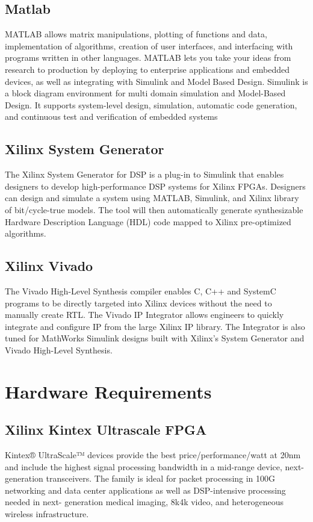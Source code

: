 \documentclass[10pt]{report}
\begin{document}
\subsection{Matlab}
MATLAB allows matrix manipulations, plotting of functions and data, implementation 
of algorithms, creation of user interfaces, and interfacing with programs written in other 
languages. MATLAB lets you take your ideas from research to production by deploying to 
enterprise applications and embedded devices, as well as integrating with Simulink and ModelBased Design. Simulink is a block diagram environment for multi domain simulation and 
Model-Based Design. It supports system-level design, simulation, automatic code generation, 
and continuous test and verification of embedded systems
\subsection{Xilinx System Generator}
The Xilinx System Generator for DSP is a plug-in to Simulink that enables designers 
to develop high-performance DSP systems for Xilinx FPGAs. Designers can design and 
simulate a system using MATLAB, Simulink, and Xilinx library of bit/cycle-true models. The 
tool will then automatically generate synthesizable Hardware Description Language (HDL) 
code mapped to Xilinx pre-optimized algorithms.
\subsection{Xilinx Vivado}
The Vivado High-Level Synthesis compiler enables C, C++ and SystemC programs to 
be directly targeted into Xilinx devices without the need to manually create RTL. The Vivado 
IP Integrator allows engineers to quickly integrate and configure IP from the large Xilinx IP 
library. The Integrator is also tuned for MathWorks Simulink designs built with Xilinx’s 
System Generator and Vivado High-Level Synthesis.
\section{Hardware Requirements}
\subsection{Xilinx Kintex Ultrascale FPGA}
Kintex® UltraScale™ devices provide the best price/performance/watt at 20nm and include the highest signal processing bandwidth in a mid-range device, next- generation transceivers. The family is ideal for packet processing in 100G networking and data center applications as well as DSP-intensive processing needed in next- generation medical imaging, 8k4k video, and heterogeneous wireless infrastructure.
\end{document}
